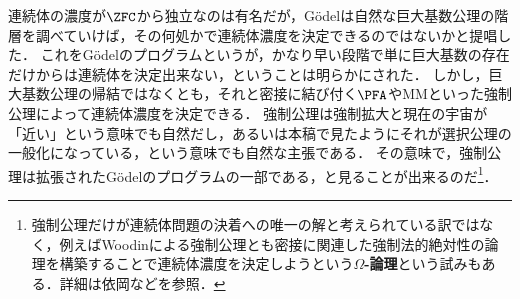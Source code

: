 \documentclass[a4j,leqno]{ltjsarticle}
\renewcommand{\emph}[1]{\textbf{\textsf{#1}}}
\newcommand{\MM}{\mathrm{MM}}
\begin{document}
連続体の濃度が$\ZFC$から独立なのは有名だが，G\"{o}delは自然な巨大基数公理の階層を調べていけば，その何処かで連続体濃度を決定できるのではないかと提唱した．
これをG\"{o}delのプログラムというが，かなり早い段階で単に巨大基数の存在だけからは連続体を決定出来ない，ということは明らかにされた．
しかし，巨大基数公理の帰結ではなくとも，それと密接に結び付く$\PFA$や$\MM$といった強制公理によって連続体濃度を決定できる．
強制公理は強制拡大と現在の宇宙が「近い」という意味でも自然だし，あるいは本稿で見たようにそれが選択公理の一般化になっている，という意味でも自然な主張である．
その意味で，強制公理は拡張されたG\"{o}delのプログラムの一部である，と見ることが出来るのだ\footnote{強制公理だけが連続体問題の決着への唯一の解と考えられている訳ではなく，例えばWoodinによる強制公理とも密接に関連した強制法的絶対性の論理を構築することで連続体濃度を決定しようという\emph{$\Omega$-論理}という試みもある．詳細は依岡\cite{Yorioka:2009}などを参照．}．

\nocite{alg-d,Jech:1997ai,Kunen:2011,Yorioka:2009}
\nocite{Lauri:2016rw}
\printbibliography[title=参考文献]
\end{document}
